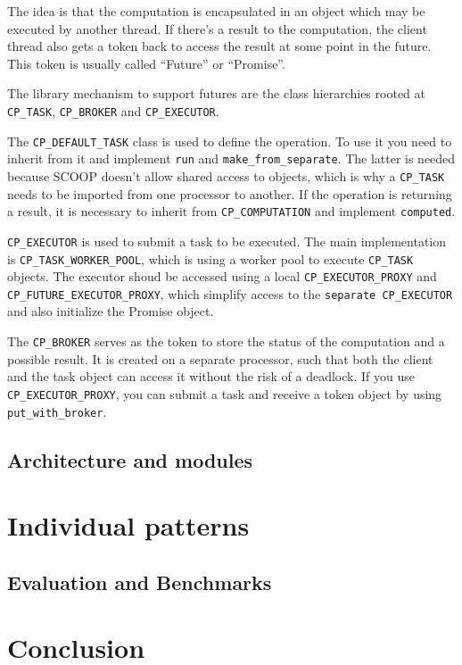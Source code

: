 \documentclass[a4paper,10pt]{report}
\begin{document}
The idea is that the computation is encapsulated in an object which may be executed by another thread.
If there's a result to the computation, the client thread also gets a token back to access the result at some point in the future.
This token is usually called ``Future'' or ``Promise''.

The library mechanism to support futures are the class hierarchies rooted at \lstinline!CP_TASK!, \lstinline!CP_BROKER! and \lstinline!CP_EXECUTOR!.

The \lstinline!CP_DEFAULT_TASK! class is used to define the operation.
To use it you need to inherit from it and implement \lstinline!run! and \lstinline!make_from_separate!.
The latter is needed because SCOOP doesn't allow shared access to objects, which is why a \lstinline!CP_TASK! needs to be imported from one processor to another.
If the operation is returning a result, it is necessary to inherit from \lstinline!CP_COMPUTATION! and implement \lstinline!computed!.

\lstinline!CP_EXECUTOR! is used to submit a task to be executed.
The main implementation is \lstinline!CP_TASK_WORKER_POOL!, which is using a worker pool to execute \lstinline!CP_TASK! objects.
The executor shoud be accessed using a local \lstinline!CP_EXECUTOR_PROXY! and \lstinline!CP_FUTURE_EXECUTOR_PROXY!, which simplify access to the \lstinline!separate CP_EXECUTOR! and also initialize the Promise object.

The \lstinline!CP_BROKER! serves as the token to store the status of the computation and a possible result.
It is created on a separate processor, such that both the client and the task object can access it without the risk of a deadlock.
If you use \lstinline!CP_EXECUTOR_PROXY!, you can submit a task and receive a token object by using \lstinline!put_with_broker!.



\subsection {Architecture and modules}
\label{sec:modules}

\section {Individual patterns}

\subsection{Evaluation and Benchmarks}


\section{Conclusion}

\todos
\end{document}
